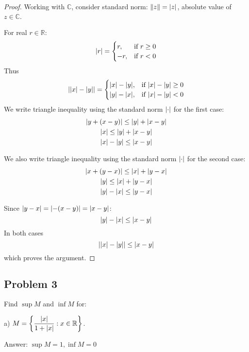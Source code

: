 \documentclass{article}
\newcommand{\R}{\mathbb{R}}
\newcommand{\C}{\mathbb{C}}
\DeclarePairedDelimiter{\norm}{\lVert}{\rVert}
\DeclarePairedDelimiter{\abs}{\lvert}{\rvert}
\DeclarePairedDelimiter{\set}{ \{ }{ \} }
\begin{document}
\begin{proof}

Working with $\C$, consider standard norm: $\norm{z} = \abs{z}$, absolute value of $z \in \C$.

For real $r \in \R$:
\[
    \abs{r} = 
    \begin{cases}
        r, & \text{if } r \geq 0 \\
        -r, & \text{if } r < 0
    \end{cases}
\]
Thus
\[
    \abs{\abs{x}-\abs{y}} = 
    \begin{cases}
        \abs{x}-\abs{y}, & \text{if } \abs{x}-\abs{y} \geq 0 \\
        \abs{y}-\abs{x}, & \text{if } \abs{x}-\abs{y} < 0
    \end{cases}
\]
We write triangle inequality using the standard norm $\abs{\cdot}$ for the first case:
\begin{gather*}
    \abs{y+(x-y)} \leq \abs{y}+\abs{x-y} \\
    \abs{x} \leq \abs{y}+\abs{x-y} \\
    \abs{x} - \abs{y} \leq \abs{x-y}   
\end{gather*}

We also write triangle inequality using the standard norm $\abs{\cdot}$ for the second case:
\begin{gather*}
    \abs{x+(y-x)} \leq \abs{x}+\abs{y-x} \\
    \abs{y} \leq \abs{x}+\abs{y-x} \\
    \abs{y} - \abs{x} \leq \abs{y-x}
\end{gather*}

Since $\abs{y - x} = \abs{-(x - y)} = \abs{x - y}$:
\[ \abs{y} - \abs{x} \leq \abs{x-y} \]
In both cases
\[ \abs{\abs{x} - \abs{y}} \leq \abs{x-y} \]
which proves the argument.

\end{proof}


\subsection*{Problem 3}

\begin{tcolorbox}
Find $\sup M$ and $\inf M$ for:

a) $M = \set*{ \dfrac{\abs{x}}{1+\abs{x}} : x \in \R }$.
\end{tcolorbox}

Answer: $\sup M = 1, \inf M = 0$
\end{document}
